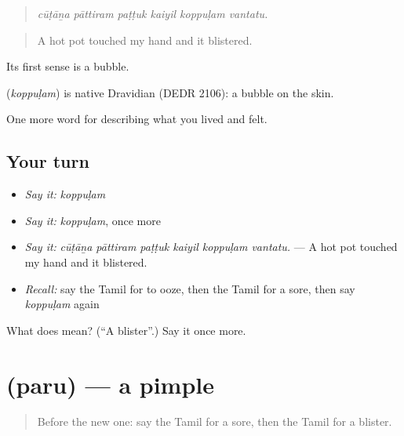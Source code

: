\begin{quote}
\emph{cūṭāṉa pāttiram paṭṭuk kaiyil koppuḷam vantatu.}
\end{quote}

\begin{quote}
A hot pot touched my hand and it blistered.
\end{quote}

Its first sense is a bubble.

\begin{cousinweb}
\textbf{} (\emph{koppuḷam}) is native Dravidian (DEDR 2106): a bubble on the skin.
\end{cousinweb}

\begin{grammarlens}[title={What you've built}]
One more word for describing what you lived and felt.
\end{grammarlens}

\subsection*{Your turn}
\begin{itemize}
\raggedright
  \item \emph{Say it:} \emph{koppuḷam}
  \item \emph{Say it:} \emph{koppuḷam}, once more
  \item \emph{Say it:} \emph{cūṭāṉa pāttiram paṭṭuk kaiyil koppuḷam vantatu.} — A hot pot touched my hand and it blistered.
  \item \emph{Recall:} say the Tamil for to ooze, then the Tamil for a sore, then say \emph{koppuḷam} again
\end{itemize}

\begin{tcolorbox}[breakable,colback=teal!4,colframe=teal!35!black,title={Before you move on}]
What does  mean? (\textquotedblleft{}A blister\textquotedblright{}.) Say it once more.
\end{tcolorbox}
\section[\texorpdfstring{\ta{பரு} (paru)}{பரு (paru)}]{ (paru) — a pimple}

\label{lesson:TA-C483-paru}



\begin{quote}
Before the new one: say the Tamil for a sore, then the Tamil for a blister.
\end{quote}

